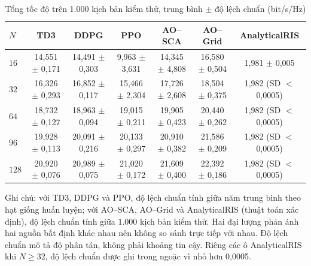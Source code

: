\begin{table}[htbp]
\centering
\caption{Tổng tốc độ trên 1.000 kịch bản kiểm thử, trung bình $\pm$ độ lệch chuẩn (bit/s/Hz)}
\label{tab:ch4-tong-toc-do}
\scriptsize
\setlength{\tabcolsep}{3pt}
\begin{tabular}{@{}lcccccc@{}}
\toprule
$N$ & \textbf{TD3} & \textbf{DDPG} & \textbf{PPO} & \textbf{AO--SCA} & \textbf{AO--Grid} & \textbf{AnalyticalRIS} \\
\midrule
$16$ & 14,551 $\pm$ 0,171 & 14,491 $\pm$ 0,303 & 9,963 $\pm$ 3,631 & 14,345 $\pm$ 4,808 & 16,580 $\pm$ 0,504 & 1,981 $\pm$ 0,005 \\
$32$ & 16,326 $\pm$ 0,293 & 16,852 $\pm$ 0,117 & 15,466 $\pm$ 2,304 & 17,726 $\pm$ 2,608 & 18,504 $\pm$ 0,375 & 1,982 (SD $<$ 0,0005) \\
$64$ & 18,732 $\pm$ 0,127 & 18,963 $\pm$ 0,094 & 19,015 $\pm$ 0,211 & 19,905 $\pm$ 0,423 & 20,440 $\pm$ 0,262 & 1,982 (SD $<$ 0,0005) \\
$96$ & 19,928 $\pm$ 0,113 & 20,091 $\pm$ 0,216 & 20,133 $\pm$ 0,297 & 20,910 $\pm$ 0,382 & 21,586 $\pm$ 0,209 & 1,982 (SD $<$ 0,0005) \\
$128$ & 20,920 $\pm$ 0,076 & 20,989 $\pm$ 0,075 & 21,020 $\pm$ 0,172 & 21,609 $\pm$ 0,400 & 22,392 $\pm$ 0,186 & 1,982 (SD $<$ 0,0005) \\
\bottomrule
\end{tabular}
\par\smallskip
\parbox{\linewidth}{\scriptsize Ghi chú: với TD3, DDPG và PPO, độ lệch chuẩn tính giữa năm trung bình theo hạt giống huấn luyện; với AO--SCA, AO--Grid và AnalyticalRIS (thuật toán xác định), độ lệch chuẩn tính giữa $1.000$ kịch bản kiểm thử. Hai đại lượng phản ánh hai nguồn bất định khác nhau nên không so sánh trực tiếp với nhau. Độ lệch chuẩn mô tả độ phân tán, không phải khoảng tin cậy. Riêng các ô AnalyticalRIS khi $N \ge 32$, độ lệch chuẩn được ghi trong ngoặc vì nhỏ hơn 0,0005.}
\end{table}
